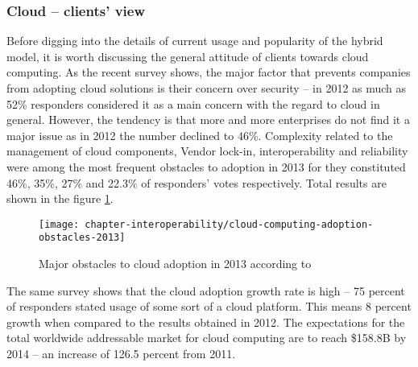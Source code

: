\subsubsection*{Cloud -- clients' view}
Before digging into the details of current usage and popularity of the hybrid model, it is worth discussing the general attitude of clients towards cloud computing. As the recent survey \cite{NBSurvey13} shows, the major factor that prevents companies from adopting cloud solutions is their concern over security -- in 2012 as much as 52\% responders considered it as a main concern with the regard to cloud in general. However, the tendency is that more and more enterprises do not find it a major issue as in 2012 the number declined to 46\%.
Complexity related to the management of cloud components, Vendor lock-in, interoperability and reliability were among the most frequent obstacles to adoption in 2013 for they constituted 46\%, 35\%, 27\% and 22.3\% of responders' votes respectively. Total results are shown in the figure \ref{fig:cloud-computing-adoption-obstacles-2013}.
\begin{figure}[!ht]
  \begin{center}
    \texttt{[image: chapter-interoperability/cloud-computing-adoption-obstacles-2013]}
  \end{center}
  \caption{Major obstacles to cloud adoption in 2013 according to \cite{NBSurvey13}}
  \label{fig:cloud-computing-adoption-obstacles-2013}
\end{figure}

The same survey shows that the cloud adoption growth rate is high -- 75 percent of responders stated usage of some sort of a cloud platform. This means 8 percent growth when compared to the results obtained in 2012. The expectations for the total worldwide addressable market for cloud computing are to reach \$158.8B by 2014 -- an increase of 126.5 percent from 2011.

